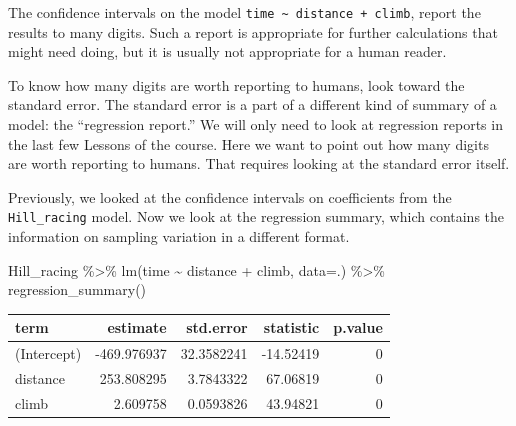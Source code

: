 \documentclass[
  letterpaper,
  DIV=11,
  numbers=noendperiod,
  oneside]{scrreprt}
\newenvironment{Shaded}{\begin{snugshade}}{\end{snugshade}}
\newcommand{\AttributeTok}[1]{\textcolor[rgb]{0.40,0.45,0.13}{#1}}
\newcommand{\FunctionTok}[1]{\textcolor[rgb]{0.28,0.35,0.67}{#1}}
\newcommand{\NormalTok}[1]{\textcolor[rgb]{0.00,0.23,0.31}{#1}}
\newcommand{\SpecialCharTok}[1]{\textcolor[rgb]{0.37,0.37,0.37}{#1}}
\begin{document}
\begin{tcolorbox}[enhanced jigsaw, colbacktitle=quarto-callout-warning-color!10!white, breakable, opacitybacktitle=0.6, colback=white, left=2mm, arc=.35mm, colframe=quarto-callout-warning-color-frame, coltitle=black, toprule=.15mm, opacityback=0, leftrule=.75mm, bottomtitle=1mm, toptitle=1mm, titlerule=0mm, title=\textcolor{quarto-callout-warning-color}{\faExclamationTriangle}\hspace{0.5em}{Demonstration: How many digits?}, rightrule=.15mm, bottomrule=.15mm]

The confidence intervals on the model
\texttt{time\ \textasciitilde{}\ distance\ +\ climb}, report the results
to many digits. Such a report is appropriate for further calculations
that might need doing, but it is usually not appropriate for a human
reader.

To know how many digits are worth reporting to humans, look toward the
standard error. The standard error is a part of a different kind of
summary of a model: the ``regression report.'' We will only need to look
at regression reports in the last few Lessons of the course. Here we
want to point out how many digits are worth reporting to humans. That
requires looking at the standard error itself.

Previously, we looked at the confidence intervals on coefficients from
the \texttt{Hill\_racing} model. Now we look at the regression summary,
which contains the information on sampling variation in a different
format.

\begin{Shaded}
\begin{Highlighting}[]
\NormalTok{Hill\_racing }\SpecialCharTok{\%\textgreater{}\%} 
  \FunctionTok{lm}\NormalTok{(time }\SpecialCharTok{\textasciitilde{}}\NormalTok{ distance }\SpecialCharTok{+}\NormalTok{ climb, }\AttributeTok{data=}\NormalTok{.) }\SpecialCharTok{\%\textgreater{}\%} 
  \FunctionTok{regression\_summary}\NormalTok{()}
\end{Highlighting}
\end{Shaded}

\ttfamily 
\begin{tabular}{lrrrr}
\toprule
term & estimate & std.error & statistic & p.value\\
\midrule
(Intercept) & -469.976937 & 32.3582241 & -14.52419 & 0\\
distance & 253.808295 & 3.7843322 & 67.06819 & 0\\
climb & 2.609758 & 0.0593826 & 43.94821 & 0\\
\bottomrule
\end{tabular} \normalfont
\bigskip


\end{tcolorbox}
\end{document}
